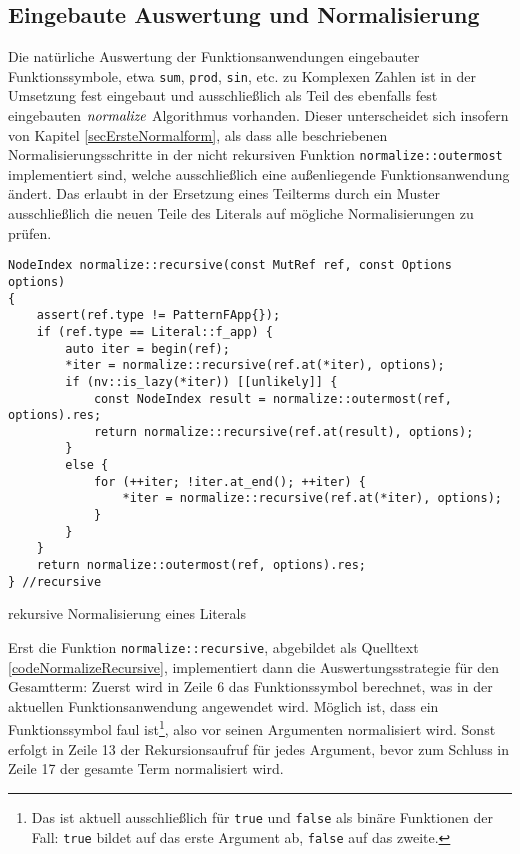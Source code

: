 \subsection{Eingebaute Auswertung und Normalisierung} \label{subsubsecAuswertungNormalCpp}

Die \glqq natürliche\grqq{} Auswertung der Funktionsanwendungen eingebauter Funktionssymbole, etwa \verb|sum|, \verb|prod|, \verb|sin|, etc. zu Komplexen Zahlen ist in der Umsetzung fest eingebaut und ausschließlich als Teil des ebenfalls fest eingebauten $\mathit{normalize}$ Algorithmus vorhanden. Dieser unterscheidet sich insofern von Kapitel \ref{secErsteNormalform}, als dass alle beschriebenen Normalisierungsschritte in der nicht rekursiven Funktion \verb|normalize::outermost| implementiert sind, welche ausschließlich eine außenliegende Funktionsanwendung ändert. Das erlaubt in der Ersetzung eines Teilterms durch ein Muster ausschließlich die neuen Teile des Literals auf mögliche Normalisierungen zu prüfen.

\begin{listing}
\footnotesize
\begin{verbatim}
NodeIndex normalize::recursive(const MutRef ref, const Options options)
{
    assert(ref.type != PatternFApp{});
    if (ref.type == Literal::f_app) {
        auto iter = begin(ref);
        *iter = normalize::recursive(ref.at(*iter), options);
        if (nv::is_lazy(*iter)) [[unlikely]] {
            const NodeIndex result = normalize::outermost(ref, options).res;
            return normalize::recursive(ref.at(result), options);
        }
        else {
            for (++iter; !iter.at_end(); ++iter) {
                *iter = normalize::recursive(ref.at(*iter), options);
            }
        }
    }
    return normalize::outermost(ref, options).res;
} //recursive
\end{verbatim}
\label{codeNormalizeRecursive}
\caption{rekursive Normalisierung eines Literals}
\end{listing}

Erst die Funktion \verb|normalize::recursive|, abgebildet als Quelltext \ref{codeNormalizeRecursive}, implementiert dann die Auswertungsstrategie für den Gesamtterm: Zuerst wird in Zeile 6 das Funktionssymbol berechnet, was in der aktuellen Funktionsanwendung angewendet wird. Möglich ist, dass ein Funktionssymbol faul ist\footnote{Das ist aktuell ausschließlich für \texttt{true} und \texttt{false} als binäre Funktionen der Fall: \texttt{true} bildet auf das erste Argument ab, \texttt{false} auf das zweite.}, also vor seinen Argumenten normalisiert wird. 
Sonst erfolgt in Zeile 13 der Rekursionsaufruf für jedes Argument, bevor zum Schluss in Zeile 17 der gesamte Term normalisiert wird.



